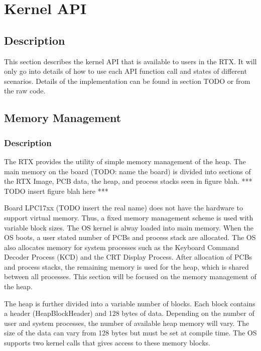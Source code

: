 \documentclass[12pt]{report}
\begin{document}
\chapter{Kernel API}
\section{Description}
This section describes the kernel API that is available to users in the RTX. It will only go into details of how to use each API function call and states of different scenarios. Details of the implementation can be found in section TODO or from the raw code.

\section{Memory Management}
\subsection{Description}
The RTX provides the utility of simple memory management of the heap. The main memory on the board (TODO: name the board) is divided into sections of the RTX Image, PCB data, the heap, and process stacks seen in figure blah.
*** TODO insert figure blah here ***

Board LPC17xx (TODO insert the real name) does not have the hardware to support virtual memory. Thus, a fixed memory management scheme is used with variable block sizes. The OS kernel is alway loaded into main memory. When the OS boots, a user stated number of PCBs and process stack are allocated. The OS also allocates memory for system processes such as the Keyboard Command Decoder Process (KCD) and the CRT Display Process. After allocation of PCBs and process stacks, the remaining memory is used for the heap, which is shared between all processes. This section will be focused on the memory management of the heap.

The heap is further divided into a variable number of blocks. Each block contains a header (HeapBlockHeader) and 128 bytes of data. Depending on the number of user and system processes, the number of available heap memory will vary. The size of the data can vary from 128 bytes but must be set at compile time. The OS supports two kernel calls that gives access to these memory blocks.
\end{document}
